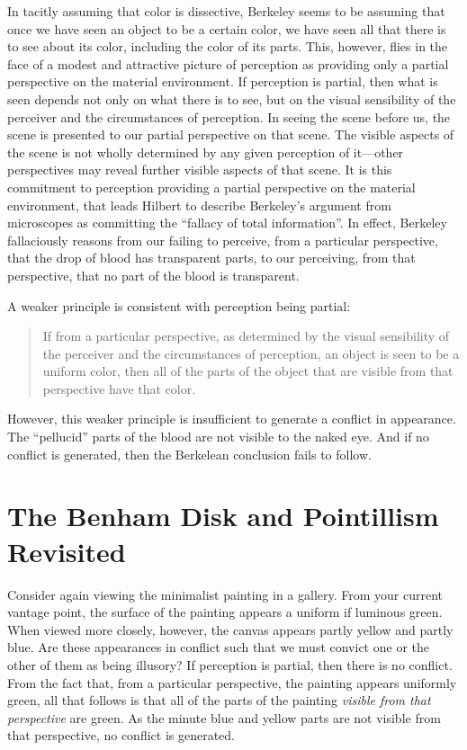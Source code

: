 \documentclass[12pt]{article}
\begin{document}
In tacitly assuming that color is dissective, Berkeley seems to be assuming that once we have seen an object to be a certain color, we have seen all that there is to see about its color, including the color of its parts. This, however, flies in the face of a modest and attractive picture of perception as providing only a partial perspective on the material environment. If perception is partial, then what is seen depends not only on what there is to see, but on the visual sensibility of the perceiver and the circumstances of perception. In seeing the scene before us, the scene is presented to our partial perspective on that scene. The visible aspects of the scene is not wholly determined by any given perception of it---other perspectives may reveal further visible aspects of that scene. It is this commitment to perception providing a partial perspective on the material environment, that leads Hilbert to describe Berkeley's argument from microscopes as committing the ``fallacy of total information''. In effect, Berkeley fallaciously reasons from our failing to perceive, from a particular perspective, that the drop of blood has transparent parts, to our perceiving, from that perspective, that no part of the blood is transparent.

A weaker principle is consistent with perception being partial:
	\begin{quote}
		If from a particular perspective, as determined by the visual sensibility of the perceiver and the circumstances of perception, an object is seen to be a uniform color, then all of the parts of the object that are visible from that perspective have that color.
	\end{quote}
However, this weaker principle is insufficient to generate a conflict in appearance. The ``pellucid'' parts of the blood are not visible to the naked eye. And if no conflict is generated, then the Berkelean conclusion fails to follow.


\section{The Benham Disk and Pointillism Revisited}\label{sub:pointillism_revisited} %

Consider again viewing the minimalist painting in a gallery. From your current vantage point, the surface of the painting appears a uniform if luminous green. When viewed more closely, however, the canvas appears partly yellow and partly blue. Are these appearances in conflict such that we must convict one or the other of them as being illusory? If perception is partial, then there is no conflict. From the fact that, from a particular perspective, the painting appears uniformly green, all that follows is that all of the parts of the painting \emph{visible from that perspective} are green. As the minute blue and yellow parts are not visible from that perspective, no conflict is generated.
\end{document}
